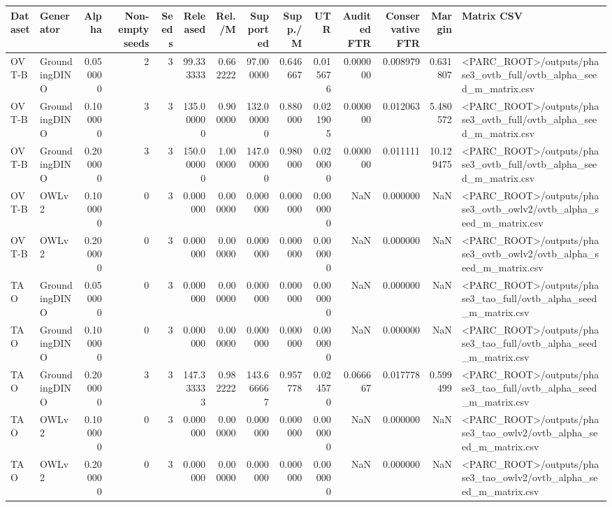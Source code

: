 \begin{tabular}{llrrrrrrrrrrrl}
\toprule
Dataset & Generator & Alpha & Non-empty seeds & Seeds & Released & Rel./M & Supported & Supp./M & UTR & Audited FTR & Conservative FTR & Margin & Matrix CSV \\
\midrule
OVT-B & GroundingDINO & 0.050000 & 2 & 3 & 99.333333 & 0.662222 & 97.000000 & 0.646667 & 0.015676 & 0.000000 & 0.008979 & 0.631807 & <PARC_ROOT>/outputs/phase3_ovtb_full/ovtb_alpha_seed_m_matrix.csv \\
OVT-B & GroundingDINO & 0.100000 & 3 & 3 & 135.000000 & 0.900000 & 132.000000 & 0.880000 & 0.021905 & 0.000000 & 0.012063 & 5.480572 & <PARC_ROOT>/outputs/phase3_ovtb_full/ovtb_alpha_seed_m_matrix.csv \\
OVT-B & GroundingDINO & 0.200000 & 3 & 3 & 150.000000 & 1.000000 & 147.000000 & 0.980000 & 0.020000 & 0.000000 & 0.011111 & 10.129475 & <PARC_ROOT>/outputs/phase3_ovtb_full/ovtb_alpha_seed_m_matrix.csv \\
OVT-B & OWLv2 & 0.100000 & 0 & 3 & 0.000000 & 0.000000 & 0.000000 & 0.000000 & 0.000000 & NaN & 0.000000 & NaN & <PARC_ROOT>/outputs/phase3_ovtb_owlv2/ovtb_alpha_seed_m_matrix.csv \\
OVT-B & OWLv2 & 0.200000 & 0 & 3 & 0.000000 & 0.000000 & 0.000000 & 0.000000 & 0.000000 & NaN & 0.000000 & NaN & <PARC_ROOT>/outputs/phase3_ovtb_owlv2/ovtb_alpha_seed_m_matrix.csv \\
TAO & GroundingDINO & 0.050000 & 0 & 3 & 0.000000 & 0.000000 & 0.000000 & 0.000000 & 0.000000 & NaN & 0.000000 & NaN & <PARC_ROOT>/outputs/phase3_tao_full/ovtb_alpha_seed_m_matrix.csv \\
TAO & GroundingDINO & 0.100000 & 0 & 3 & 0.000000 & 0.000000 & 0.000000 & 0.000000 & 0.000000 & NaN & 0.000000 & NaN & <PARC_ROOT>/outputs/phase3_tao_full/ovtb_alpha_seed_m_matrix.csv \\
TAO & GroundingDINO & 0.200000 & 3 & 3 & 147.333333 & 0.982222 & 143.666667 & 0.957778 & 0.024570 & 0.066667 & 0.017778 & 0.599499 & <PARC_ROOT>/outputs/phase3_tao_full/ovtb_alpha_seed_m_matrix.csv \\
TAO & OWLv2 & 0.100000 & 0 & 3 & 0.000000 & 0.000000 & 0.000000 & 0.000000 & 0.000000 & NaN & 0.000000 & NaN & <PARC_ROOT>/outputs/phase3_tao_owlv2/ovtb_alpha_seed_m_matrix.csv \\
TAO & OWLv2 & 0.200000 & 0 & 3 & 0.000000 & 0.000000 & 0.000000 & 0.000000 & 0.000000 & NaN & 0.000000 & NaN & <PARC_ROOT>/outputs/phase3_tao_owlv2/ovtb_alpha_seed_m_matrix.csv \\
\bottomrule
\end{tabular}
